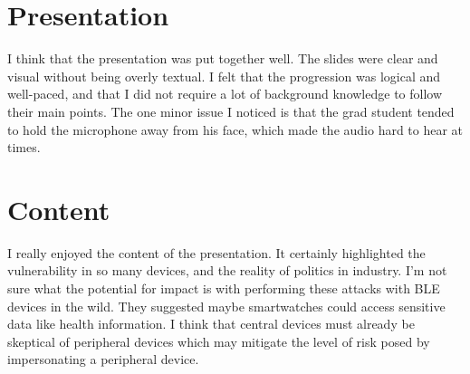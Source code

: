 \documentclass{article}
\begin{document}
\section{Presentation}
I think that the presentation was put together well.
The slides were clear and visual without being overly textual.
I felt that the progression was logical and well-paced, and that I did not require a lot of background knowledge to follow their main points.
The one minor issue I noticed is that the grad student tended to hold the microphone away from his face, which made the audio hard to hear at times.

\section{Content}
I really enjoyed the content of the presentation.
It certainly highlighted the vulnerability in so many devices, and the reality of politics in industry.
I'm not sure what the potential for impact is with performing these attacks with BLE devices in the wild.
They suggested maybe smartwatches could access sensitive data like health information.
I think that central devices must already be skeptical of peripheral devices which may mitigate the level of risk posed by impersonating a peripheral device.
\end{document}
